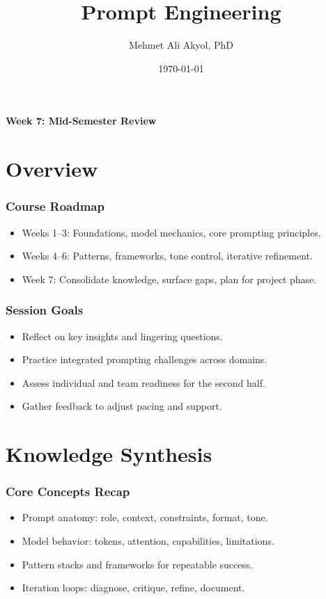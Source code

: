 \documentclass{beamer}
\title{Prompt Engineering}
\author{Mehmet Ali Akyol, PhD}
\institute{Ankara Medipol University}
\date{\today}
\begin{document}
\begin{frame}
    \titlepage
    \begin{center}
        \vspace{1cm}
        \textbf{Week 7: Mid-Semester Review}
    \end{center}
\end{frame}

\section{Overview}

\begin{frame}
    \frametitle{Course Roadmap}
    \begin{itemize}
        \item Weeks 1--3: Foundations, model mechanics, core prompting principles.
        \item Weeks 4--6: Patterns, frameworks, tone control, iterative refinement.
        \item Week 7: Consolidate knowledge, surface gaps, plan for project phase.
    \end{itemize}
\end{frame}

\begin{frame}
    \frametitle{Session Goals}
    \begin{itemize}
        \item Reflect on key insights and lingering questions.
        \item Practice integrated prompting challenges across domains.
        \item Assess individual and team readiness for the second half.
        \item Gather feedback to adjust pacing and support.
    \end{itemize}
\end{frame}

\section{Knowledge Synthesis}

\begin{frame}
    \frametitle{Core Concepts Recap}
    \begin{itemize}
        \item Prompt anatomy: role, context, constraints, format, tone.
        \item Model behavior: tokens, attention, capabilities, limitations.
        \item Pattern stacks and frameworks for repeatable success.
        \item Iteration loops: diagnose, critique, refine, document.
    \end{itemize}
\end{frame}
\end{document}

